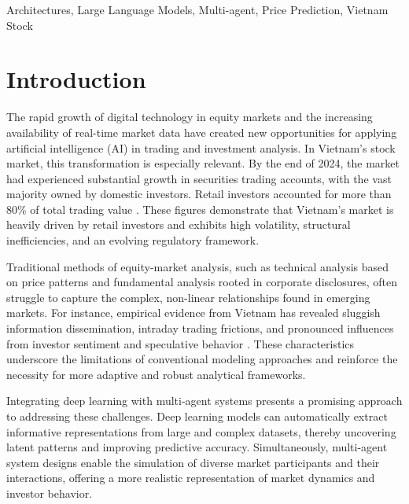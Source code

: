 \documentclass{ieeeaccess}
\begin{document}
\begin{keywords}
Architectures, Large Language Models, Multi-agent, Price Prediction, Vietnam Stock
\end{keywords}

\titlepgskip=-21pt

\maketitle

\section{Introduction}
\label{sec:introduction}
The rapid growth of digital technology in equity markets and the increasing availability of real-time market data  have created new opportunities for applying artificial intelligence (AI) in trading and investment analysis. In Vietnam’s stock market, this transformation is especially relevant. By the end of 2024, the market had experienced substantial growth in securities trading accounts, with the vast majority owned by domestic investors. Retail investors accounted for more than 80\% of total trading value \cite{vietnamnews2025}. These figures demonstrate that Vietnam’s market is heavily driven by retail investors and exhibits high volatility, structural inefficiencies, and an evolving regulatory framework.

Traditional methods of equity-market analysis, such as technical analysis based on price patterns and fundamental analysis rooted in corporate disclosures, often struggle to capture the complex, non-linear relationships found in emerging markets. For instance, empirical evidence from Vietnam has revealed sluggish information dissemination, intraday trading frictions, and pronounced influences from investor sentiment and speculative behavior \cite{ha2025}. These characteristics underscore the limitations of conventional modeling approaches and reinforce the necessity for more adaptive and robust analytical frameworks.

Integrating deep learning with multi-agent systems presents a promising approach to addressing these challenges. Deep learning models can automatically extract informative representations from large and complex datasets, thereby uncovering latent patterns and improving predictive accuracy. Simultaneously, multi-agent system designs enable the simulation of diverse market participants and their interactions, offering a more realistic representation of market dynamics and investor behavior.
\end{document}
